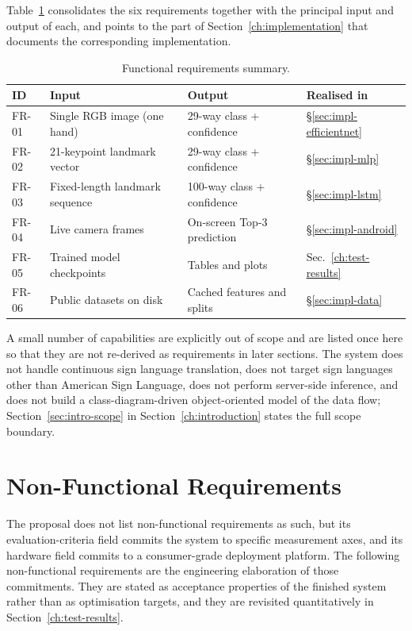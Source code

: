 Table~\ref{tab:design-fr} consolidates the six requirements together
with the principal input and output of each, and points to the
part of Section~\ref{ch:implementation} that documents the
corresponding implementation.

\begin{table}[!ht]
\centering
\caption{Functional requirements summary.}
\label{tab:design-fr}
\small
\begin{tabular}{lp{4.2cm}p{3.6cm}l}
\toprule
\textbf{ID} & \textbf{Input} & \textbf{Output} & \textbf{Realised in} \\
\midrule
FR-01 & Single RGB image (one hand)        & 29-way class + confidence  & \S\ref{sec:impl-efficientnet} \\
FR-02 & 21-keypoint landmark vector        & 29-way class + confidence  & \S\ref{sec:impl-mlp} \\
FR-03 & Fixed-length landmark sequence     & 100-way class + confidence & \S\ref{sec:impl-lstm} \\
FR-04 & Live camera frames                 & On-screen Top-3 prediction & \S\ref{sec:impl-android} \\
FR-05 & Trained model checkpoints          & Tables and plots           & Sec.~\ref{ch:test-results} \\
FR-06 & Public datasets on disk            & Cached features and splits & \S\ref{sec:impl-data} \\
\bottomrule
\end{tabular}
\end{table}

A small number of capabilities are explicitly out of scope and are
listed once here so that they are not re-derived as requirements in
later sections. The system does not handle continuous sign language
translation, does not target sign languages other than American Sign
Language, does not perform server-side inference, and does not build
a class-diagram-driven object-oriented model of the data flow;
Section~\ref{sec:intro-scope} in Section~\ref{ch:introduction}
states the full scope boundary.

\section{Non-Functional Requirements}
\label{sec:design-nfr}

The proposal does not list non-functional requirements as such, but
its evaluation-criteria field commits the system to specific
measurement axes, and its hardware field commits to a consumer-grade
deployment platform. The following non-functional requirements are
the engineering elaboration of those commitments. They are stated as
acceptance properties of the finished system rather than as
optimisation targets, and they are revisited quantitatively in
Section~\ref{ch:test-results}.

